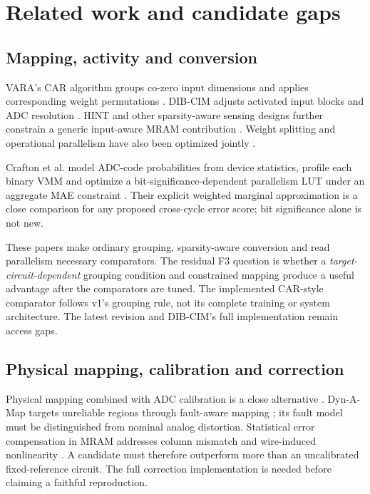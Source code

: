 \section{Related work and candidate gaps}

\subsection{Mapping, activity and conversion}

VARA's CAR algorithm groups co-zero input dimensions and applies corresponding weight
permutations \cite{S01}. DIB-CIM adjusts activated input blocks and ADC resolution
\cite{S02}. HINT and other sparsity-aware sensing designs further constrain a generic
input-aware MRAM contribution \cite{S03,S04,S28}. Weight splitting and operational
parallelism have also been optimized jointly \cite{S05}.

Crafton et al. model ADC-code probabilities from device statistics, profile each binary
VMM and optimize a bit-significance-dependent parallelism LUT under an aggregate MAE
constraint \cite{S31}. Their explicit weighted marginal approximation is a close
comparison for any proposed cross-cycle error score; bit significance alone is not new.

These papers make ordinary grouping, sparsity-aware conversion and read parallelism
necessary comparators. The residual F3 question is whether a \emph{target-circuit-dependent}
grouping condition and constrained mapping produce a useful advantage after the
comparators are tuned. The implemented CAR-style comparator follows v1's grouping rule,
not its complete training or system architecture. The latest revision and DIB-CIM's full
implementation remain access gaps.

\subsection{Physical mapping, calibration and correction}

Physical mapping combined with ADC calibration is a close alternative \cite{S06}.
Dyn-A-Map targets unreliable regions through fault-aware mapping \cite{S07}; its fault
model must be distinguished from nominal analog distortion. Statistical error compensation
in MRAM addresses column mismatch and wire-induced nonlinearity \cite{S29}. A candidate
must therefore outperform more than an uncalibrated fixed-reference circuit. The full
correction implementation is needed before claiming a faithful reproduction.

